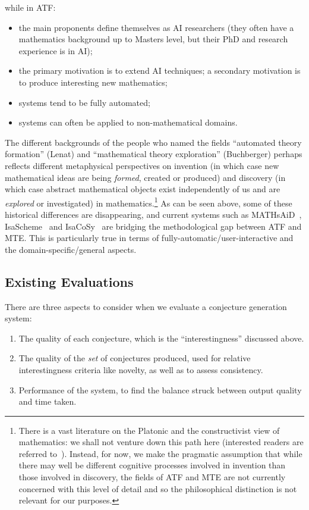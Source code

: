 while in ATF:

\begin{itemize}
\item the main proponents define themselves as AI researchers (they
  often have a mathematics background up to Masters level, but their
  PhD and research experience is in AI);
\item the primary motivation is to extend AI techniques; a secondary
  motivation is to produce interesting new mathematics;
\item systems tend to be fully automated;
\item systems can often be applied to non-mathematical domains.
\end{itemize}

The different backgrounds of the people who named the fields
``automated theory formation'' (Lenat) and ``mathematical theory
exploration'' (Buchberger) perhaps reflects different metaphysical
perspectives on invention (in which case new mathematical ideas are
being {\em formed}, created or produced) and discovery (in which case
abstract mathematical objects exist independently of us and are {\em
  explored} or investigated) in mathematics.\footnote{There is a vast
  literature on the Platonic and the constructivist view of
  mathematics: we shall not venture down this path here (interested
  readers are referred to~\cite{hersh:97,shapiro}). Instead, for now,
  we make the pragmatic assumption that while there may well be
  different cognitive processes involved in invention than those
  involved in discovery, the fields of ATF and MTE are not currently
  concerned with this level of detail and so the philosophical
  distinction is not relevant for our purposes.} As can be seen above,
some of these historical differences are disappearing, and current
systems such as MATHsAiD~\cite{roy}, IsaScheme~\cite{MontanoRivas2011}
and IsaCoSy~\cite{Johansson.Dixon.Bundy:conjecture-generation} are bridging the
methodological gap between ATF and MTE. This is particularly true in terms of
fully-automatic/user-interactive and the domain-specific/general
aspects.

\subsection{Existing Evaluations}
\label{sec:existing}

There are three aspects to consider when we evaluate a conjecture generation
system:

\begin{enumerate}
\item The quality of each conjecture, which is the ``interestingness'' discussed
  above.
\item The quality of the \emph{set} of conjectures produced, used for relative
  interestingness criteria like novelty, as well as to assess consistency.
\item Performance of the system, to find the balance struck between output
  quality and time taken.
\end{enumerate}

